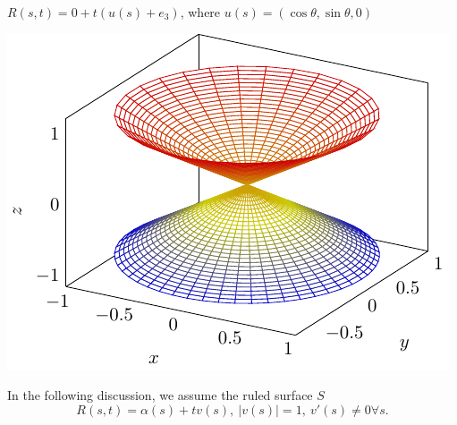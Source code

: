 \begin{example}
    \(R(s,t)=0+t\left(u(s)+e_3\right)\), where \(u(s)=\left(
        \cos\theta,\sin\theta,0
    \right)\)
    \begin{center}
        \includegraphics{picture/week9/ruled surface-cone.pdf}

    \end{center}
\end{example}
In the following discussion, we assume the ruled surface \(S\)
\[
    R(s,t)=\alpha(s)+t v(s),~|v(s)|=1,~v'(s)\neq 0\forall s.    
\]
